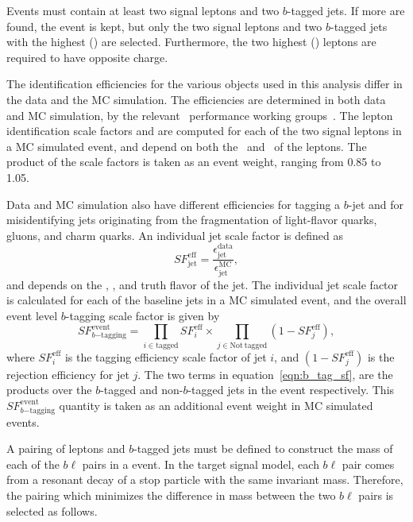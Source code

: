 Events must contain at least two signal leptons and two $b$-tagged jets.
If more are found, the event is kept, but only the two signal leptons and two
$b$-tagged jets with the highest \ET(\pt) are selected.
Furthermore, the two highest \ET(\pt) leptons are required to have opposite charge.

The identification efficiencies for the various objects used in this analysis
differ in the data and the MC simulation.
The efficiencies are determined in both data and MC simulation, by the relevant
\atlas\ performance working groups~\cite{egamma2014,Aad:2014rra}.
The lepton identification scale factors and are computed for each of the two
signal leptons in a MC simulated event, and depend on both the
\pt\ and \eta\ of the leptons.
The product of the scale factors is taken as an event weight, ranging from
0.85 to 1.05.

Data and MC simulation also have different efficiencies for tagging a $b$-jet
and for misidentifying jets originating from the fragmentation of light-flavor
quarks, gluons, and charm quarks. 
An individual jet scale factor is defined as
\begin{equation}
  SF_\mathrm{jet}^\mathrm{eff}
  =
  \frac{\epsilon_\mathrm{jet}^\mathrm{data}}{\epsilon_\mathrm{jet}^\mathrm{MC}},
\end{equation}
and depends on the \et, \eta, and truth flavor of the jet.
The individual jet scale factor is calculated for each of the baseline jets in
a MC simulated event, and the overall event level $b$-tagging scale factor is
given by 
\begin{equation}
  \label{eqn:b_tag_sf}
  SF_{b\mathrm{-tagging}}^\mathrm{event} =
  \prod_{i \in \mathrm{tagged}}
  SF_i^\mathrm{eff}
  \times
  \prod_{j \in \mathrm{Not~tagged}}
  (1- SF_j^\mathrm{eff}),
\end{equation}
where $SF_i^\mathrm{eff}$ is the tagging efficiency scale factor of jet $i$, and
$(1- SF_j^\mathrm{eff})$ is the rejection efficiency for jet $j$.
The two terms in equation~\ref{eqn:b_tag_sf}, are the products over the
$b$-tagged and non-$b$-tagged jets in the event respectively.
This $SF_{b\mathrm{-tagging}}^\mathrm{event}$ quantity is taken as an additional
event weight in MC simulated events.

A pairing of leptons and $b$-tagged jets must be defined to construct the mass
of each of the $b\ell$ pairs in a event.
In the target signal model, each $b\ell$ pair comes from a resonant decay of a
stop particle with the same invariant mass.
Therefore, the pairing which minimizes the difference in mass between the two
$b\ell$ pairs is selected as follows.

